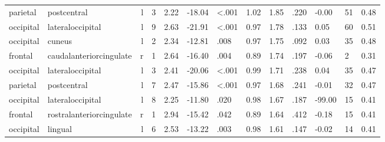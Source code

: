 \documentclass{article}
\begin{document}
\begin{longtable}{llrR{1.3cm}R{1cm}R{1.3cm}R{1cm}R{1cm}R{1.3cm}R{1cm}R{1.8cm}R{1.3cm}R{1.8cm}}
  parietal &               postcentral &    l &         3 &                  2.22 &           -18.04 &      \textless.001 &                               1.02 &                          1.85 &                            .220 &  -0.00 &     51 &      0.48 \\
 occipital &          lateraloccipital &    l &         9 &                  2.63 &           -21.91 &      \textless.001 &                               0.97 &                          1.78 &                            .133 &   0.05 &     60 &      0.51 \\
 occipital &                    cuneus &    l &         2 &                  2.34 &           -12.81 &               .008 &                               0.97 &                          1.75 &                            .092 &   0.03 &     35 &      0.48 \\
   frontal &   caudalanteriorcingulate &    r &         1 &                  2.64 &           -16.40 &               .004 &                               0.89 &                          1.74 &                            .197 &  -0.06 &      2 &      0.31 \\
 occipital &          lateraloccipital &    l &         3 &                  2.41 &           -20.06 &      \textless.001 &                               0.99 &                          1.71 &                            .238 &   0.04 &     35 &      0.47 \\
  parietal &               postcentral &    l &         7 &                  2.47 &           -15.86 &      \textless.001 &                               0.97 &                          1.68 &                            .241 &  -0.01 &     32 &      0.47 \\
 occipital &          lateraloccipital &    l &         8 &                  2.25 &           -11.80 &               .020 &                               0.98 &                          1.67 &                            .187 & -99.00 &     15 &      0.41 \\
   frontal &  rostralanteriorcingulate &    r &         1 &                  2.94 &           -15.42 &               .042 &                               0.89 &                          1.64 &                            .412 &  -0.18 &     15 &      0.41 \\
 occipital &                   lingual &    l &         6 &                  2.53 &           -13.22 &               .003 &                               0.98 &                          1.61 &                            .147 &  -0.02 &     14 &      0.41 \\

\end{longtable}
\end{document}
